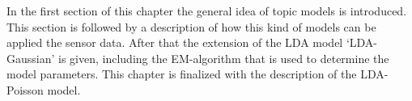 



In the first section of this chapter the general idea of topic models is introduced. This section is followed by a description of how this kind of models can be applied the sensor data. After that the extension of the LDA model `LDA-Gaussian' is given, including the EM-algorithm that is used to determine the model parameters. This chapter is finalized with the description of the LDA-Poisson model.

